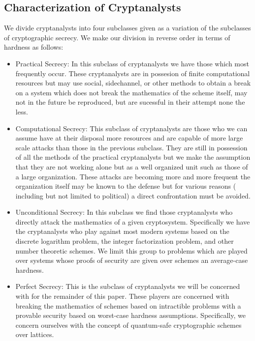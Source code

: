 \subsection{Characterization of Cryptanalysts}

We divide cryptanalysts into four subclasses given as a variation of
the subclasses of cryptographic secrecy.
We make our division in reverse order in terms of hardness as
follows:

\begin{itemize}
\item{Practical Secrecy:} In this subclass of cryptanalysts we have those
which most frequently occur. These cryptanalysts are in possesion of
finite computational resources but may use social, sidechannel, or
other methods to obtain a break on a system which does not break the
mathematics of the scheme itself, may not in the future be reproduced,
but are sucessful in their attempt none the less.

\item{Computational Secrecy:} This subclass of cryptanalysts are those who
we can assume have at their disposal more resources and are capable of
more large scale attacks than those in the previous subclass. They are
still in possession of all the methods of the practical cryptanalysts
but we make the assumption that they are not working alone but as a
well organized unit such as those of a large organization. These
attacks are becoming more and more frequent the organization itself may
be known to the defense but for various reasons ( including but not
limited to political) a direct confrontation must be avoided.

\item{Unconditional Secrecy:} In this subclass we find those cryptanalysts
who directly attack the mathematics of a given cryptosystem.
Specifically we have the cryptanalysts who play against most modern
systems based on the discrete logarithm problem, the integer
factorization problem, and other number theoretic schemes. We limit
this group to problems which are played over systems whose proofs of
security are given over schemes an average-case hardness.

\item{Perfect Secrecy:} This is the subclass of cryptanalysts we will be
concerned with for the remainder of this paper. These players are
concerned with breaking the mathematics of schemes based on intractible
problems with a provable security based on worst-case hardness
assumptions. Specifically, we concern ourselves with the concept of
quantum-safe cryptographic schemes over lattices.
\end{itemize}